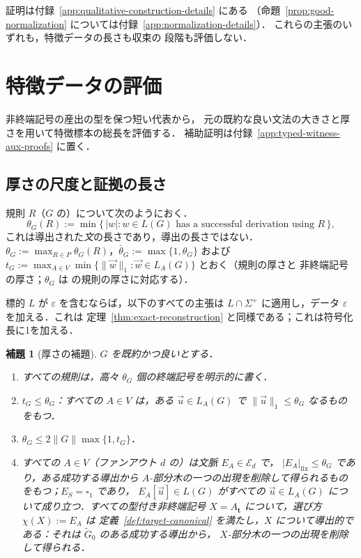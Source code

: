 \documentclass[11pt,a4paper]{ltjsarticle}
\numberwithin{equation}{section}
\theoremstyle{plain}
\newtheorem{lemma}[theorem]{補題}
\theoremstyle{definition}
\theoremstyle{remark}
\newcommand{\tuple}[1]{\vec{#1}}
\newcommand{\blank}{\square}
\newcommand{\eps}{\varepsilon}
\theoremstyle{plain}
\begin{document}
証明は付録~\ref{app:qualitative-construction-details} にある
（命題~\ref{prop:good-normalization} については付録~\ref{app:normalization-details}）．
これらの主張のいずれも，特徴データの長さも収束の
段階も評価しない．

\section{特徴データの評価}
\label{sec:char-data}
非終端記号の産出の型を保つ短い代表から，
元の既約な良い文法の大きさと厚さを用いて特徴標本の総長を評価する．
補助証明は付録~\ref{app:typed-witness-aux-proofs} に置く．

\subsection{厚さの尺度と証拠の長さ}
\label{subsec:thickness-contexts}

規則 $R$（$G$ の）について次のようにおく．
\[
 \theta_G(R):=\min\{\,|w|:w\in L(G)\text{ has a successful derivation using }R\,\},
\]
これは導出された\emph{文}の長さであり，導出の長さではない．
$\theta_G:=\max_{R\in P}\theta_G(R)$，$\bar\theta_G:=\max\{1,\theta_G\}$ および
$t_G:=\max_{A\in V}\min\{\|\tuple w\|_1:\tuple w\in L_A(G)\}$ とおく（規則の厚さと
非終端記号の厚さ；$\theta_G$ は
\cite{Yoshinaka2011} の規則の厚さに対応する）．


標的 $L$ が $\eps$ を含むならば，以下のすべての主張は
$L\cap\Sigma^+$ に適用し，データ $\eps$ を加える．これは
定理~\ref{thm:exact-reconstruction} と同様である；これは符号化長に1を加える．

\begin{lemma}[厚さの補題]
\label{lem:thickness-equivalence}
\label{lem:thickness-local-bounds}
\label{lem:untyped-contexts}
$G$ を既約かつ良いとする．
\begin{enumerate}[label=\textup{(\roman*)},leftmargin=*]
\item すべての規則は，高々 $\theta_G$ 個の終端記号を明示的に書く．
\item $t_G\le\theta_G$：すべての $A\in V$ は，ある $\tuple u\in L_A(G)$ で
$\|\tuple u\|_1\le\theta_G$ なるものをもつ．
\item $\theta_G\le 2\|G\|\max\{1,t_G\}$．
\item すべての $A\in V$（ファンアウト $d$ の）は文脈 $E_A\in\mathcal E_d$ で，
$|E_A|_{\mathrm{fix}}\le\theta_G$ であり，ある成功する導出から
$A$-部分木の一つの出現を削除して得られるものをもつ；$E_S=\blank_1$ であり，
$E_A[\tuple u]\in L(G)$ がすべての $\tuple u\in L_A(G)$ について成り立つ．すべての型付き非終端記号
$X=A_{\mathbf t}$ について，選び方 $\chi(X):=E_A$ は
定義~\ref{def:target-canonical} を満たし，$X$ について\emph{導出的}である：それは
$\widetilde G_0$ のある成功する導出から，
$X$-部分木の一つの出現を削除して得られる．
\end{enumerate}
\end{lemma}
\end{document}
